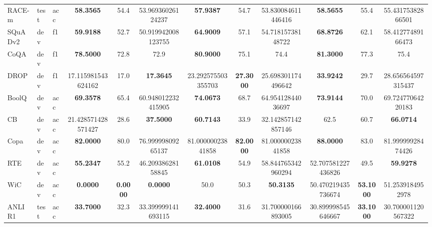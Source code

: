 \documentclass{article}
\theoremstyle{definition}
\begin{document}
\begin{table}
\begin{tabular}{lllSSSSSSSSS}
    RACE-m & test & acc &
    \bfseries 58.3565 & 54.4 & 53.96936026124237 &
    \bfseries 57.9387 & 54.7 & 53.830084611446416 &
    \bfseries 58.5655 & 55.4 & 55.43175382866501
    \\

    SQuADv2 & dev & f1 &
    \bfseries 59.9188 & 52.7 & 50.919942008123755 &
    \bfseries 64.9009 & 57.1 & 54.71815738148722 &
    \bfseries 68.8726 & 62.1 & 58.41277489166473
    \\

    CoQA & dev & f1 &
    \bfseries 78.5000 & 72.8 & 72.9 &
    \bfseries 80.9000 & 75.1 & 74.4 &
    \bfseries 81.3000 & 77.3 & 75.4
    \\

    DROP & dev & f1 &
    17.115981543624162 & 17.0 & \bfseries 17.3645 &
    23.292575503355703 & \bfseries 27.3000 & 25.698301174496642 &
    \bfseries 33.9242 & 29.7 & 28.656564597315437
    \\

    BoolQ & dev & acc &
    \bfseries 69.3578 & 65.4 & 60.948012232415905 &
    \bfseries 74.0673 & 68.7 & 64.95412844036697 &
    \bfseries 73.9144 & 70.0 & 69.72477064220183
    \\

    CB & dev & acc &
    21.428571428571427 & 28.6 & \bfseries 37.5000 &
    \bfseries 60.7143 & 33.9 & 32.142857142857146 &
    62.5 & 60.7 & \bfseries 66.0714
    \\

    Copa & dev & acc &
    \bfseries 82.0000 & 80.0 & 76.99999809265137 &
    81.00000023841858 & \bfseries 82.0000 & 81.00000023841858 &
    \bfseries 88.0000 & 83.0 & 81.99999928474426
    \\

    RTE & dev & acc &
    \bfseries 55.2347 & 55.2 & 46.20938628158845 &
    \bfseries 61.0108 & 54.9 & 58.844765342960294 &
    52.707581227436826 & 49.5 & \bfseries 59.9278
    \\

    WiC & dev & acc &
    \bfseries 0.0000 & \bfseries 0.0000 & \bfseries 0.0000 &
    50.0 & 50.3 & \bfseries 50.3135 &
    50.470219435736674 & \bfseries 53.1000 & 51.2539184952978
    \\

    ANLI R1 & test & acc &
    \bfseries 33.7000 & 32.3 & 33.399999141693115 &
    \bfseries 32.4000 & 31.6 & 31.700000166893005 &
    30.899998545646667 & \bfseries 33.1000 & 30.700001120567322
    \\


\end{tabular}
\end{table}
\end{document}
